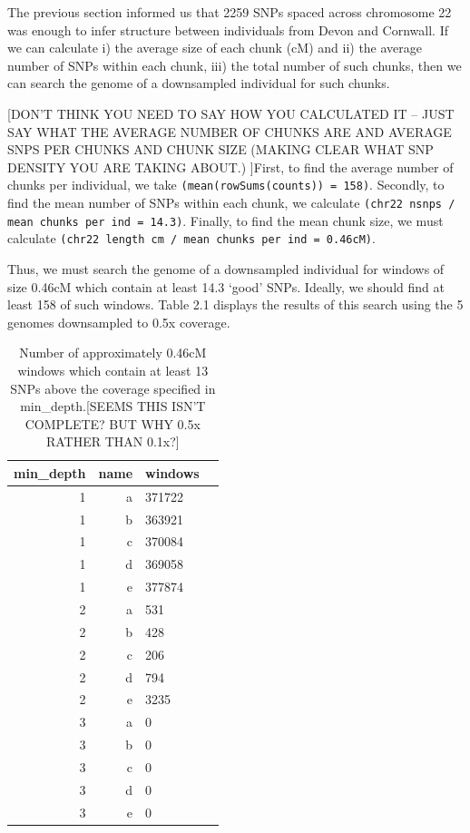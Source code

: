 The previous section informed us that 2259 SNPs spaced across chromosome 22 was enough to infer structure between individuals from Devon and Cornwall. If we can calculate i) the average size of each chunk (cM) and ii) the average number of SNPs within each chunk, iii) the total number of such chunks, then we can search the genome of a downsampled individual for such chunks.

{\color{red}[DON'T THINK YOU NEED TO SAY HOW YOU CALCULATED IT -- JUST SAY WHAT THE AVERAGE NUMBER OF CHUNKS ARE AND AVERAGE SNPS PER CHUNKS AND CHUNK SIZE (MAKING CLEAR WHAT SNP DENSITY YOU ARE TAKING ABOUT.) ]First, to find the average number of chunks per individual, we take \texttt{(mean(rowSums(counts)) = 158)}. Secondly, to find the mean number of SNPs within each chunk, we calculate \texttt{(chr22 nsnps / mean chunks per ind = 14.3)}. Finally, to find the mean chunk size, we must calculate \texttt{(chr22 length cm / mean chunks per ind = 0.46cM)}.}

Thus, we must search the genome of a downsampled individual for windows of size 0.46cM which contain at least 14.3 `good' SNPs. Ideally, we should find at least 158 of such windows. Table 2.1 displays the results of this search using the 5 genomes downsampled to 0.5x coverage.

\begin{table}[ht]
\centering
\begin{tabular}{rrlr}
  \hline
 min\_depth & name & windows \\ 
  \hline
    1 & a & 371722 \\ 
     1 & b & 363921 \\ 
     1 & c & 370084 \\ 
     1 & d & 369058 \\ 
     1 & e & 377874 \\ 
     2 & a & 531 \\ 
     2 & b & 428 \\ 
    2 & c & 206 \\ 
     2 & d & 794 \\ 
     2 & e & 3235 \\ 
     3 & a &   0 \\ 
     3 & b &   0 \\ 
     3 & c &   0 \\ 
     3 & d &   0 \\ 
     3 & e &   0 \\ 
   \hline
\end{tabular}
\caption{\label{tab:table-name}Number of approximately 0.46cM windows which contain at least 13 SNPs above the coverage specified in min\_depth.{\color{red}[SEEMS THIS ISN'T COMPLETE? BUT WHY 0.5x RATHER THAN 0.1x?]}}
\end{table}
